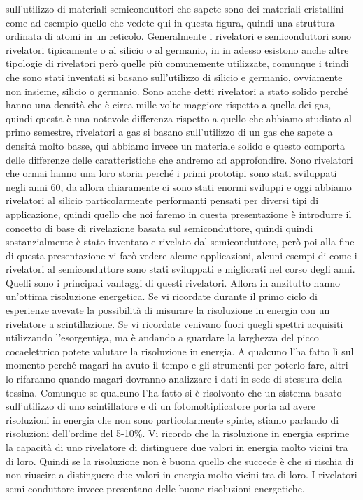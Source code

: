 {sull'utilizzo di materiali semiconduttori che sapete sono dei materiali cristallini come ad esempio quello che vedete qui in questa figura, quindi una struttura ordinata di atomi in un reticolo. Generalmente i rivelatori e semiconduttori sono rivelatori tipicamente o al silicio o al germanio, in in adesso esistono anche altre tipologie di rivelatori però quelle più comunemente utilizzate, comunque i trindi che sono stati inventati si basano sull'utilizzo di silicio e germanio, ovviamente non insieme, silicio o germanio. Sono anche detti rivelatori a stato solido perché hanno una densità che è circa mille volte maggiore rispetto a quella dei gas, quindi questa è una notevole differenza rispetto a quello che abbiamo studiato al primo semestre, rivelatori a gas si basano sull'utilizzo di un gas che sapete a densità molto basse, qui abbiamo invece un materiale solido e questo comporta delle differenze delle caratteristiche che andremo ad approfondire. Sono rivelatori che ormai hanno una loro storia perché i primi prototipi sono stati sviluppati negli anni 60, da allora chiaramente ci sono stati enormi sviluppi e oggi abbiamo rivelatori al silicio particolarmente performanti pensati per diversi tipi di applicazione, quindi quello che noi faremo in questa presentazione è introdurre il concetto di base di rivelazione basata sul semiconduttore, quindi quindi sostanzialmente è stato inventato e rivelato dal semiconduttore, però poi alla fine di questa presentazione vi farò vedere alcune applicazioni, alcuni esempi di come i rivelatori al semiconduttore sono stati sviluppati e migliorati nel corso degli anni. Quelli sono i principali vantaggi di questi rivelatori. Allora in anzitutto hanno un'ottima risoluzione energetica. Se vi ricordate durante il primo ciclo di esperienze avevate la possibilità di misurare la risoluzione in energia con un rivelatore a scintillazione. Se vi ricordate venivano fuori quegli spettri acquisiti utilizzando l'esorgentiga, ma è andando a guardare la larghezza del picco cocaelettrico potete valutare la risoluzione in energia. A qualcuno l'ha fatto lì sul momento perché magari ha avuto il tempo e gli strumenti per poterlo fare, altri lo rifaranno quando magari dovranno analizzare i dati in sede di stessura della tessina. Comunque se qualcuno l'ha fatto si è risolvonto che un sistema basato sull'utilizzo di uno scintillatore e di un fotomoltiplicatore porta ad avere risoluzioni in energia che non sono particolarmente spinte, stiamo parlando di risoluzioni dell'ordine del 5-10\%. Vi ricordo che la risoluzione in energia esprime la capacità di uno rivelatore di distinguere due valori in energia molto vicini tra di loro. Quindi se la risoluzione non è buona quello che succede è che si rischia di non riuscire a distinguere due valori in energia molto vicini tra di loro. I rivelatori semi-conduttore invece presentano delle buone risoluzioni energetiche.

}
